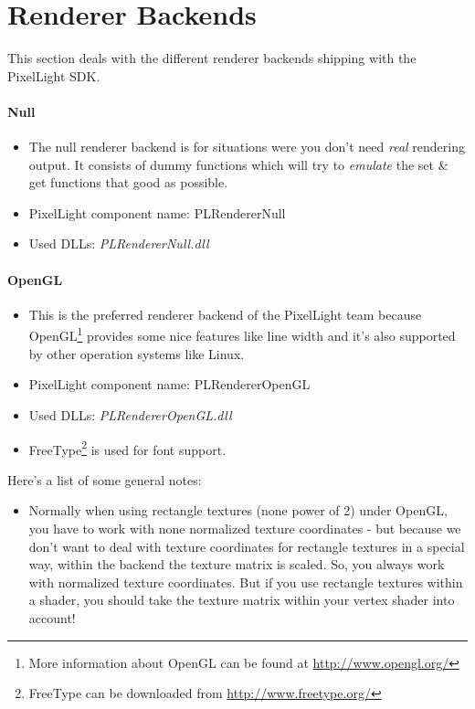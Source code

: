 \section{Renderer Backends}
This section deals with the different renderer backends shipping with the PixelLight \ac{SDK}.


\paragraph{Null}
\begin{itemize}
\item The null renderer backend is for situations were you don't need \emph{real} rendering output. It consists of dummy functions which will try to \emph{emulate} the set \& get functions that good as possible.
\item PixelLight component name: PLRendererNull
\item Used \ac{DLL}s: \emph{PLRendererNull.dll}
\end{itemize}


\paragraph{\ac{OpenGL}}
\begin{itemize}
\item This is the preferred renderer backend of the PixelLight team because \ac{OpenGL}\footnote{More information about \ac{OpenGL} can be found at \url{http://www.opengl.org/}} provides some nice features like line width and it's also supported by other operation systems like Linux.
\item PixelLight component name: PLRendererOpenGL
\item Used \ac{DLL}s: \emph{PLRendererOpenGL.dll}
\item FreeType\footnote{FreeType can be downloaded from \url{http://www.freetype.org/}} is used for font support.
\end{itemize}

Here's a list of some general notes:
\begin{itemize}
\item Normally when using rectangle textures (none power of 2) under \ac{OpenGL}, you have to work with none normalized texture coordinates - but because we don't want to deal with texture coordinates for rectangle textures in a special way, within the backend the texture matrix is scaled. So, you always work with normalized texture coordinates. But if you use rectangle textures within a shader, you should take the texture matrix within your vertex shader into account!
\end{itemize}

